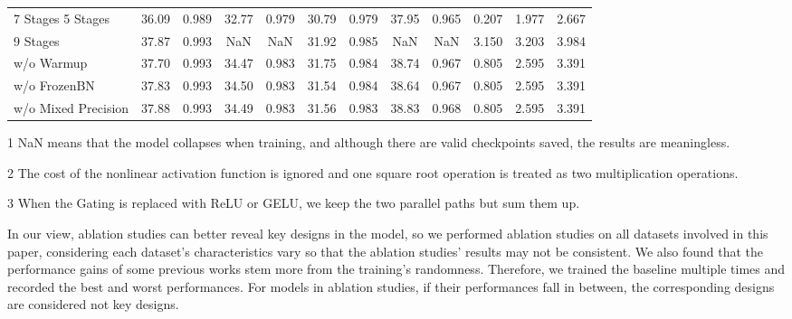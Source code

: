 \documentclass[10pt,twocolumn,letterpaper]{article}
\newcommand{\gr}{\rowcolor[rgb]{0.95,0.97,1.0}}
\newcommand{\rt}{\textcolor[rgb]{0.75,0.25,0.25}}
\newcommand{\gt}{\textcolor[rgb]{0.25,0.75,0.25}}
\begin{document}
\begin{table*}[t]
\begin{center}
{\begin{threeparttable}
\begin{tabular}{lccccccccccc}
                7 Stages  5 Stages        & \rt{36.09} & \rt{0.989} & \rt{32.77} & \rt{0.979} & \rt{30.79} & \rt{0.979} & \rt{37.95} & \rt{0.965} & \gt{0.207} & \gt{1.977} & \gt{2.667} \\
                \hspace{3.35em}  9 Stages &    {37.87} &    {0.993} & \rt{NaN}   & \rt{NaN}   & \gt{31.92} & \gt{0.985} & \rt{NaN}   & \rt{NaN}   & \rt{3.150} & \rt{3.203} & \rt{3.984} \\
                \gr w/o Warmup                         &    {37.70} &    {0.993} &    {34.47} &    {0.983} & \gt{31.75} &    {0.984} & \rt{38.74} &    {0.967} & 0.805 & 2.595 & 3.391 \\
                \gr w/o FrozenBN                       &    {37.83} &    {0.993} &    {34.50} &    {0.983} &    {31.54} &    {0.984} & \rt{38.64} &    {0.967} & 0.805 & 2.595 & 3.391 \\
                \gr w/o Mixed Precision                &    {37.88} &    {0.993} &    {34.49} &    {0.983} &    {31.56} &    {0.983} &    {38.83} &    {0.968} & 0.805 & 2.595 & 3.391 \\
                \hline
            \end{tabular}
            \begin{tablenotes}
                \small
                \item[1] NaN means that the model collapses when training, and although there are valid checkpoints saved, the results are meaningless.
                \item[2] The cost of the nonlinear activation function is ignored and one square root operation is treated as two multiplication operations.
                \item[3] When the Gating is replaced with ReLU or GELU, we keep the two parallel paths but sum them up.
              \end{tablenotes}
            \end{threeparttable}
        }
    \end{center}
    \vspace{-0.75em}
\end{table*}


In our view, ablation studies can better reveal key designs in the model, so we performed ablation studies on all datasets involved in this paper, considering each dataset's characteristics vary so that the ablation studies' results may not be consistent.
We also found that the performance gains of some previous works stem more from the training's randomness.
Therefore, we trained the baseline multiple times and recorded the best and worst performances. 
For models in ablation studies, if their performances fall in between, the corresponding designs are considered not key designs.
\end{document}
